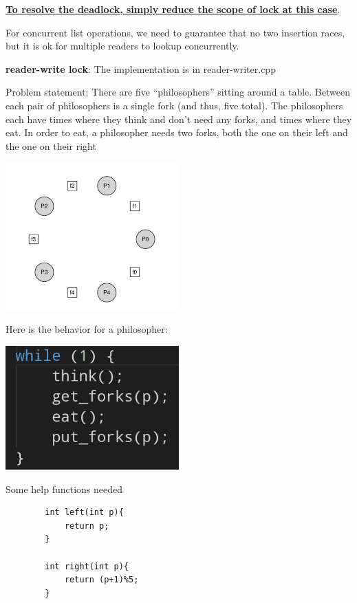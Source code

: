     \underline{\textbf{To resolve the deadlock, simply reduce the scope of lock at this case}}.



    For concurrent list operations, we need to guarantee that no two insertion races,
    but it is ok for multiple readers to lookup concurrently.

    \textbf{reader-write lock}: The implementation is in reader-writer.cpp


    Problem statement: 
    There are five “philosophers” sitting around a table. 
    Between each pair of philosophers is a single fork (and thus, five total). 
    The philosophers each have times where they think and don’t need any forks, 
    and times where they eat. In order to eat, a philosopher needs two forks, 
    both the one on their left and the one on their right

    \includegraphics[width=0.5\textwidth]{chapters/Cucurrency/Cucurrency/dining_philosophers.png}

    Here is the behavior for a philosopher:

    \includegraphics[width=0.5\textwidth]{chapters/Cucurrency/Cucurrency/dp_indiv.png}

    Some help functions needed

    \begin{lstlisting}
        int left(int p){
            return p;
        }

        int right(int p){
            return (p+1)%5;
        }
    \end{lstlisting}

